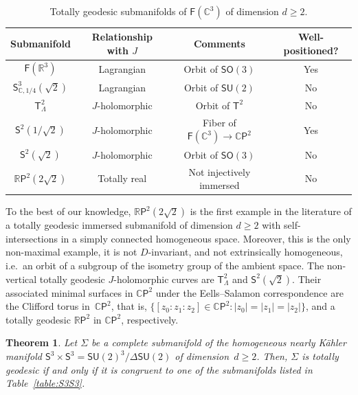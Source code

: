 \documentclass[11pt,a4paper,final]{amsart}
\newcommand{\s}{\mathsf}
\newcommand{\R}{\mathbb{R}}
\newcommand{\C}{\mathbb{C}}
\newtheorem{thmx}{Theorem}
\theoremstyle{definition}
\renewcommand{\arraystretch}{1.2}
\begin{document}
\begin{table}[h!]
	\centering
	\caption{Totally geodesic submanifolds of $\mathsf{F}(\C^{3})$ of dimension $d\ge 2$.}
	\label{table:FC3}
	\renewcommand{\arraystretch}{1.2}
	\begin{tabular}{cccc}
		\toprule 
		Submanifold & Relationship with $J$ & Comments & Well-positioned? \\
		\toprule
		$\mathsf{F}(\R^{3})$ & Lagrangian & Orbit of $\mathsf{SO}(3)$ & Yes\\
		\hline
		$\mathsf{S}^{3}_{\C,1/4}(\sqrt{2})$ & Lagrangian & Orbit of $\mathsf{SU}(2)$ & No \\
		\hline
		$\mathsf{T}^2_{\Lambda}$ & $J$-holomorphic & Orbit of $\s{T}^2$ & No \\
		\hline
		$\mathsf{S}^{2}\left(1/\sqrt{2}\right)$ & $J$-holomorphic & Fiber of $\mathsf{F}(\C^{3})\to\C\mathsf{P}^{2}$ & Yes \\
		\hline
		$\mathsf{S}^{2}\left(\sqrt{2}\right)$ & $J$-holomorphic & Orbit of $\mathsf{SO}(3)$ & No \\
		\hline
		$\R\mathsf{P}^{2}\left(2 \sqrt{2}\right)$ & Totally real & Not injectively immersed & No \\
		\bottomrule
	\end{tabular}
\end{table}
To the best of our knowledge, $\R\s{P}^2(2\sqrt{2})$ is the first example in the literature of a totally geodesic immersed submanifold of dimension $d\geq 2$ with self-intersections in a simply connected homogeneous space.
Moreover, this is the only non-maximal example, it is not $D$-invariant, and not extrinsically homogeneous, i.e.\ an orbit of a subgroup of the isometry group of the ambient space.  The non-vertical totally geodesic $J$-holomorphic curves are  $\s{T}^2_\Lambda$ and $\s{S}^2(\sqrt{2})$. Their associated minimal surfaces in $\C\s{P}^2$ under the Eells--Salamon correspondence are the Clifford torus in~$\C\s{P}^2$, that is, $\{[z_0:z_1:z_2]\in \mathbb{C}\s{P}^2: \lvert z_{0}\rvert=\lvert z_{1}\rvert=\lvert z_{2}\rvert\}$, and a totally geodesic $\R\s{P}^2$ in $\C\s{P}^2$, respectively.

\begin{thmx}\label{th:tg-s3s3-classification}
	Let $\Sigma$ be a complete submanifold of the homogeneous nearly Kähler manifold $\s{S}^3 \times \s{S}^3=\s{SU}(2)^{3}/\Delta\s{SU}(2)$  of dimension~$d\ge 2$. Then, $\Sigma$ is totally geodesic if and only if it is congruent to one of the submanifolds listed in Table~\ref{table:S3S3}.
\end{thmx}
\end{document}
